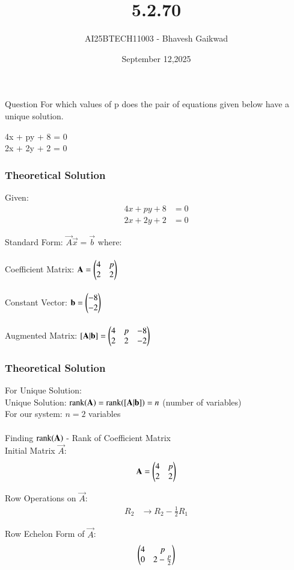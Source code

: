 \documentclass{beamer}
\title
{5.2.70}
\date{September 12,2025}
\author 
{AI25BTECH11003 - Bhavesh Gaikwad}
\begin{document}
\frame{\titlepage}
\begin{frame}{Question}
For which values of p does the pair of equations given below have a unique solution.
\begin{center}
4x + py + 8 = 0 \\
2x + 2y + 2 = 0 
\end{center}
\end{frame}


\begin{frame}[fragile]
    \frametitle{Theoretical Solution}
    Given:
\begin{align}
4x + py + 8 &= 0 \\
2x + 2y + 2 &= 0
\end{align}

Standard Form: $ \vec{A}\vec{x} = \vec{b} $ where:\\\\
Coefficient Matrix: $ \mathbf{A} = \begin{pmatrix}4 & p \\ 2 & 2\end{pmatrix} $\\\\
Constant Vector: $ \mathbf{b} = \begin{pmatrix}-8 \\ -2\end{pmatrix} $\\\\
Augmented Matrix: $ [\mathbf{A}|\mathbf{b}] = \begin{pmatrix}4 & p & -8 \\ 2 & 2 & -2\end{pmatrix} $
\end{frame}



\begin{frame}[fragile]
    \frametitle{Theoretical Solution}
For Unique Solution:\\
Unique Solution: $ \text{rank}(\mathbf{A}) = \text{rank}([\mathbf{A}|\mathbf{b}]) = n $ (number of variables)\\
For our system: $ n = 2 $ variables\\\\

Finding $\text{rank}(\mathbf{A})$ - Rank of Coefficient Matrix\\

Initial Matrix $ \vec{A} $:
\begin{equation}
\mathbf{A} = \begin{pmatrix}4 & p \\ 2 & 2\end{pmatrix}
\end{equation}

Row Operations on $\vec{A}$:
\begin{align}
R_2 &\to R_2 - \frac{1}{2}R_1
\end{align}

Row Echelon Form of $ \vec{A} $:
\begin{equation}
\begin{pmatrix}4 & p \\ 0 & 2 - \tfrac{p}{2}\end{pmatrix}
\end{equation}
\end{frame}
\end{document}
